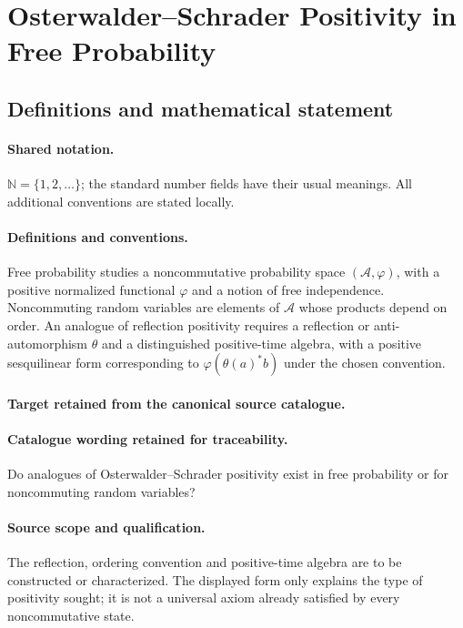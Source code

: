 \documentclass[11pt]{article}
\begin{document}
\section{Osterwalder–Schrader Positivity in Free Probability}\label{statement}

\subsection{Definitions and mathematical statement}

\paragraph{Shared notation.}$\mathbb N=\{1,2,\ldots\}$; the standard number fields have their usual meanings. All additional conventions are stated locally.


\paragraph{Definitions and conventions.}
Free probability studies a noncommutative probability space $(\mathcal A,\varphi)$, with a positive normalized functional $\varphi$ and a notion of free independence. Noncommuting random variables are elements of $\mathcal A$ whose products depend on order. An analogue of reflection positivity requires a reflection or anti-automorphism $\theta$ and a distinguished positive-time algebra, with a positive sesquilinear form corresponding to $\varphi(\theta(a)^*b)$ under the chosen convention.

\paragraph{Target retained from the canonical source catalogue.}
\paragraph{Catalogue wording retained for traceability.}
Do analogues of Osterwalder–Schrader positivity exist in free probability or for noncommuting random variables?

\paragraph{Source scope and qualification.}
The reflection, ordering convention and positive-time algebra are to be constructed or characterized. The displayed form only explains the type of positivity sought; it is not a universal axiom already satisfied by every noncommutative state.
\end{document}
